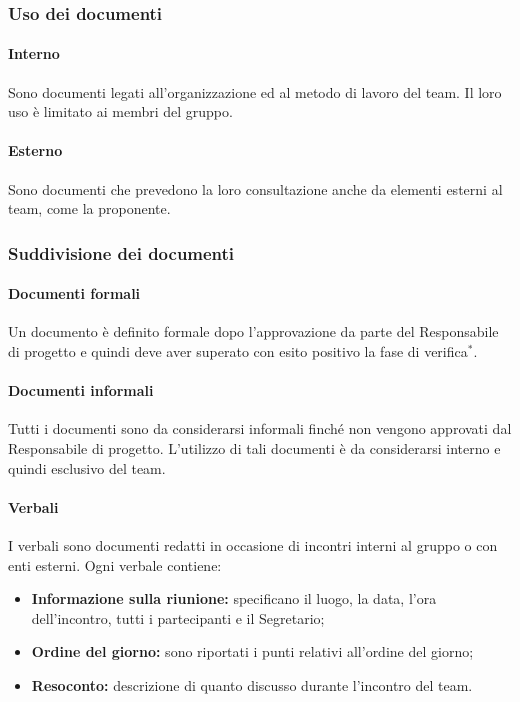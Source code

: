 \documentclass[11pt,a4paper]{article}
\begin{document}
{	\subsubsection{Uso dei documenti}
	\paragraph{Interno}
	Sono documenti legati all'organizzazione ed al metodo di lavoro del team. Il loro uso è limitato ai membri del gruppo.
	\paragraph{Esterno}
	Sono documenti che prevedono la loro consultazione anche da elementi esterni al team, come la proponente.
	\subsubsection{Suddivisione dei documenti}
	\paragraph{Documenti formali\\}
	Un documento è definito formale dopo l’approvazione da parte del Responsabile di progetto e quindi deve aver superato con esito positivo la fase di verifica$^*$.
	
	\paragraph{Documenti informali\\}
	Tutti i documenti sono da considerarsi informali finché non vengono approvati dal Responsabile di progetto. L’utilizzo di tali documenti è da considerarsi interno e quindi esclusivo del team.
	
	\paragraph{Verbali\\}
	I verbali sono documenti redatti in occasione di incontri interni al gruppo o con enti esterni. Ogni verbale contiene:
	
	\begin{itemize}
		\item \textbf{Informazione sulla riunione:} specificano il luogo, la data, l'ora dell’incontro, tutti i partecipanti e il Segretario;
		\item \textbf{Ordine del giorno:} sono riportati i punti relativi all’ordine del giorno;
		\item \textbf{Resoconto:} descrizione di quanto discusso durante l'incontro del team.
	\end{itemize}
	
}
\end{document}
